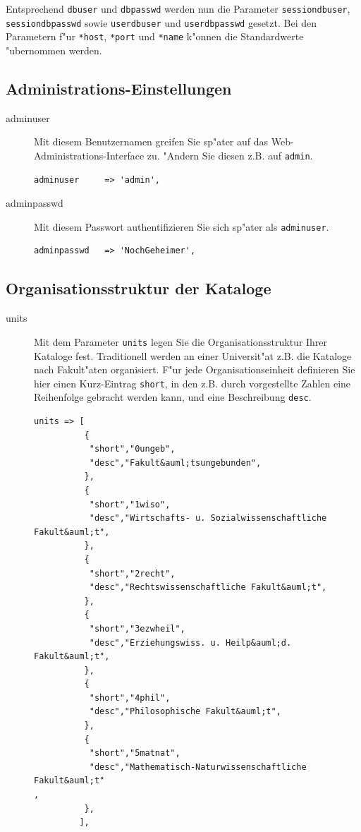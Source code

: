 \documentclass[11pt, twoside, a4paper, BCOR8mm, DIV12, bibtotoc,idxtotoc]{scrbook}
\begin{document}
Entsprechend \texttt{dbuser} und \texttt{dbpasswd} werden nun die
Parameter \texttt{sessiondbuser}, \texttt{sessiondbpasswd} sowie
\texttt{userdbuser} und \texttt{userdbpasswd} gesetzt. Bei den
Parametern f"ur \texttt{*host}, \texttt{*port} und \texttt{*name}
k"onnen die Standardwerte "ubernommen werden.



\subsection{Administrations-Einstellungen}
\label{ssec:admineinstellung}

\begin{description}
\item[adminuser] Mit diesem Benutzernamen greifen Sie sp"ater auf das
  Web-Administrations-Interface zu. "Andern Sie diesen z.B. auf
  \texttt{admin}.
\begin{verbatim}
adminuser     => 'admin',
\end{verbatim}
\item[adminpasswd] Mit diesem Passwort authentifizieren Sie sich
  sp"ater als \texttt{adminuser}.
\begin{verbatim}
adminpasswd   => 'NochGeheimer',
\end{verbatim}
\end{description}


\subsection{Organisationsstruktur der Kataloge}

\begin{description}
\item[units] Mit dem Parameter \texttt{units} legen Sie die
  Organisationsstruktur Ihrer Kataloge fest. Traditionell werden an
  einer Universit"at z.B. die Kataloge nach Fakult"aten
  organisiert. F"ur jede Organisationseinheit definieren Sie hier
  einen Kurz-Eintrag \texttt{short}, in den z.B. durch vorgestellte
  Zahlen eine Reihenfolge gebracht werden kann, und eine Beschreibung
  \texttt{desc}. 
\begin{verbatim}
units => [
          {
           "short","0ungeb",
           "desc","Fakult&auml;tsungebunden",
          },
          {
           "short","1wiso",
           "desc","Wirtschafts- u. Sozialwissenschaftliche Fakult&auml;t",
          },
          {
           "short","2recht",
           "desc","Rechtswissenschaftliche Fakult&auml;t",
          },
          {
           "short","3ezwheil",
           "desc","Erziehungswiss. u. Heilp&auml;d. Fakult&auml;t",
          },
          {
           "short","4phil",
           "desc","Philosophische Fakult&auml;t",
          },
          {
           "short","5matnat",
           "desc","Mathematisch-Naturwissenschaftliche Fakult&auml;t"
,
          },
         ],
\end{verbatim}
\end{description}
\end{document}
